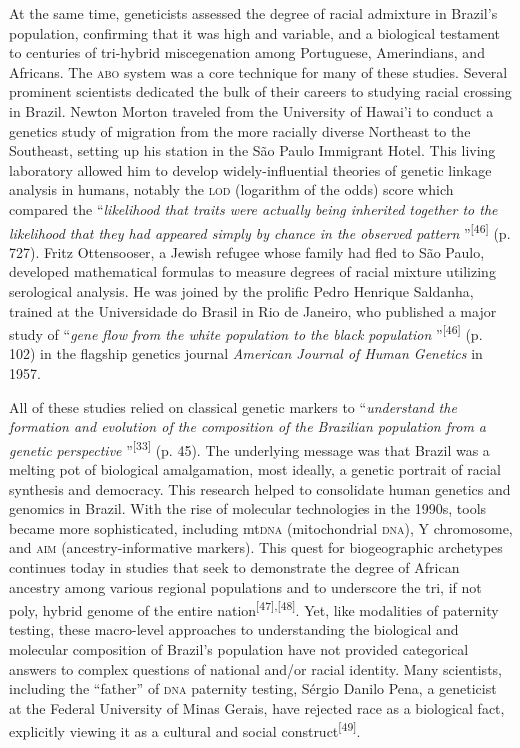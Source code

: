 \documentclass{article}
\begin{document}
At the same time, geneticists assessed the degree of racial admixture in
Brazil’s population, confirming that it was high and variable, and a biological
testament to centuries of tri-hybrid miscegenation among Portuguese,
Amerindians, and Africans. The \textsc{abo} system was a core technique for many of these
studies. Several prominent scientists dedicated the bulk of their careers to
studying racial crossing in Brazil. Newton Morton traveled from the University
of Hawai’i to conduct a genetics study of migration from the more racially
diverse Northeast to the Southeast, setting up his station in the São Paulo
Immigrant Hotel. This living laboratory allowed him to develop
widely-influential theories of genetic linkage analysis in humans, notably the
\textsc{lod} (logarithm of the odds) score which compared the “\textit{likelihood that
traits were actually being inherited together to the likelihood that they had
appeared simply by chance in the observed pattern}
”\textsuperscript{[}\textsuperscript{46}\textsuperscript{]}
(p. 727). Fritz Ottensooser, a Jewish refugee whose family had fled to São
Paulo, developed mathematical formulas to measure degrees of racial mixture
utilizing serological analysis. He was joined by the prolific Pedro Henrique
Saldanha, trained at the Universidade do Brasil in Rio de Janeiro, who published
a major study of “\textit{gene flow from the white population to the black
population}
”\textsuperscript{[}\textsuperscript{46}\textsuperscript{]}
(p. 102) in the flagship genetics journal \textit{American Journal of Human
Genetics}
in 1957.

All of these studies relied on classical genetic markers to “\textit{understand
the formation and evolution of the composition of the Brazilian population from
a genetic perspective}
”\textsuperscript{[}\textsuperscript{33}\textsuperscript{]}
(p. 45). The underlying message was that Brazil was a melting pot of biological
amalgamation, most ideally, a genetic portrait of racial synthesis and
democracy. This research helped to consolidate human genetics and genomics in
Brazil. With the rise of molecular technologies in the 1990s, tools became more
sophisticated, including mt\textsc{dna} (mitochondrial \textsc{dna}), Y chromosome, and \textsc{aim}
(ancestry-informative markers). This quest for biogeographic archetypes
continues today in studies that seek to demonstrate the degree of African
ancestry among various regional populations and to underscore the tri, if not
poly, hybrid genome of the entire nation\textsuperscript{[}\textsuperscript{47}\textsuperscript{]}\textsuperscript{,}\textsuperscript{[}\textsuperscript{48}\textsuperscript{]}. Yet, like modalities of paternity testing, these macro-level approaches to
understanding the biological and molecular composition of Brazil’s population
have not provided categorical answers to complex questions of national and/or
racial identity. Many scientists, including the “father” of \textsc{dna} paternity
testing, Sérgio Danilo Pena, a geneticist at the Federal University of Minas
Gerais, have rejected race as a biological fact, explicitly viewing it as a
cultural and social construct\textsuperscript{[}\textsuperscript{49}\textsuperscript{]}.
\end{document}
